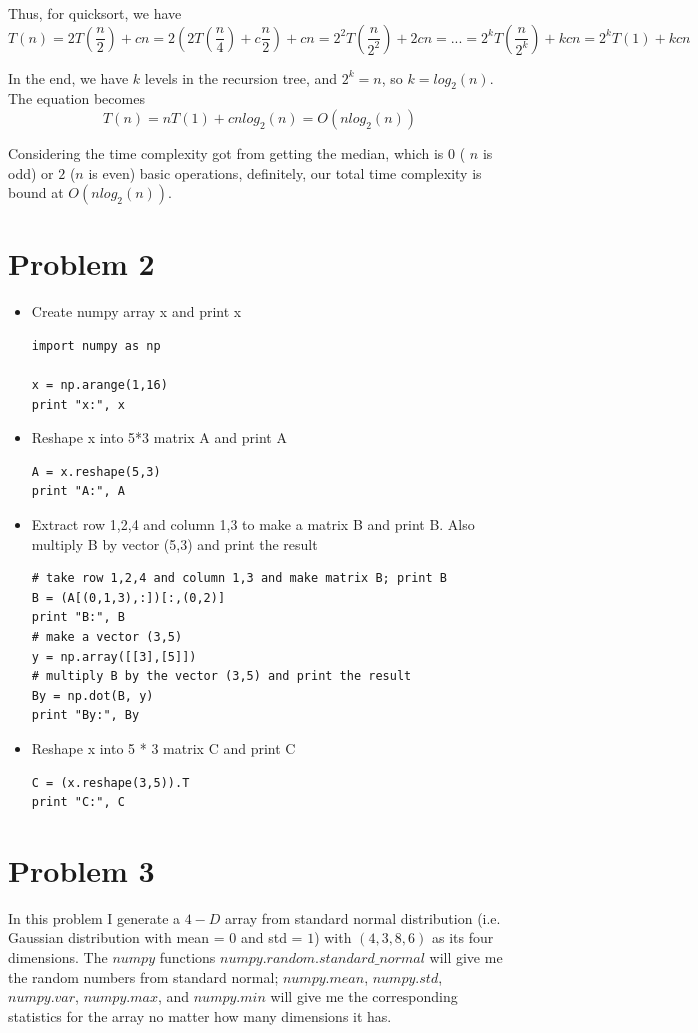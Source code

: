 Thus, for quicksort, we have 
\[
T(n) = 2 T(\frac{n}{2}) + cn = 2 ( 2 T(\frac{n}{4}) + c \frac{n}{2} ) + cn = 2^2 T(\frac{n}{2^2}) + 2cn = ... = 2^k T(\frac{n}{2^k}) + kcn = 2^k T(1) + kcn
\]

In the end, we have $k$ levels in the recursion tree, and $2^k = n$, so $k = log_2{(n)}$. The equation becomes 
\[
T(n) = n T(1) + cnlog_2{(n)} = O(nlog_2{(n)})
\]

Considering the time complexity got from getting the median, which is $0$ ( $n$ is odd) or $2$ ($n$ is even) basic operations, definitely, our total time complexity is bound at $O(nlog_2{(n)})$.


\section*{Problem 2}

\begin{itemize}

\item Create numpy array x and print x
\begin{verbatim}
import numpy as np

x = np.arange(1,16)
print "x:", x
\end{verbatim}

\item Reshape x into 5*3 matrix A and print A
\begin{verbatim}
A = x.reshape(5,3)
print "A:", A
\end{verbatim}

\item Extract row 1,2,4 and column 1,3 to make a matrix B and print B. Also multiply B by vector (5,3) and print the result
\begin{verbatim}
# take row 1,2,4 and column 1,3 and make matrix B; print B
B = (A[(0,1,3),:])[:,(0,2)]
print "B:", B
# make a vector (3,5)
y = np.array([[3],[5]])
# multiply B by the vector (3,5) and print the result
By = np.dot(B, y)
print "By:", By
\end{verbatim}

\item Reshape x into 5 * 3 matrix C and print C
\begin{verbatim}
C = (x.reshape(3,5)).T
print "C:", C
\end{verbatim}

\end{itemize}


\section*{Problem 3}
In this problem I generate a $4-D$ array from standard normal distribution (i.e. Gaussian distribution with mean = $0$ and std = $1$) with $(4,3,8,6)$ as its four dimensions. The $numpy$ functions $numpy.random.standard\_normal$ will give me the random numbers from standard normal; $numpy.mean$, $numpy.std$, $numpy.var$, $numpy.max$, and $numpy.min$ will give me the corresponding statistics for the array no matter how many dimensions it has. \\
 
